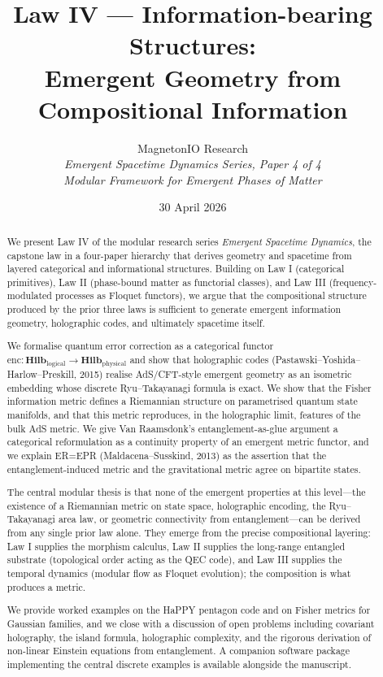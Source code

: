 \documentclass[12pt]{article}
\title{Law IV --- Information-bearing Structures:\\
Emergent Geometry from Compositional Information}
\author{MagnetonIO Research \\
\textit{Emergent Spacetime Dynamics Series, Paper 4 of 4} \\
\textit{Modular Framework for Emergent Phases of Matter}}
\date{30 April 2026}
\theoremstyle{definition}
\theoremstyle{remark}
\newcommand{\Hilb}{\mathbf{Hilb}}
\newcommand{\enc}{\mathrm{enc}}
\begin{document}
\maketitle

\begin{abstract}
We present Law IV of the modular research series \emph{Emergent Spacetime Dynamics}, the capstone law in a four-paper hierarchy that derives geometry and spacetime from layered categorical and informational structures. Building on Law I (categorical primitives), Law II (phase-bound matter as functorial classes), and Law III (frequency-modulated processes as Floquet functors), we argue that the compositional structure produced by the prior three laws is sufficient to generate emergent information geometry, holographic codes, and ultimately spacetime itself.

We formalise quantum error correction as a categorical functor $\enc \colon \Hilb_{\mathrm{logical}} \to \Hilb_{\mathrm{physical}}$ and show that holographic codes (Pastawski--Yoshida--Harlow--Preskill, 2015) realise AdS/CFT-style emergent geometry as an isometric embedding whose discrete Ryu--Takayanagi formula is exact. We show that the Fisher information metric defines a Riemannian structure on parametrised quantum state manifolds, and that this metric reproduces, in the holographic limit, features of the bulk AdS metric. We give Van Raamsdonk's entanglement-as-glue argument a categorical reformulation as a continuity property of an emergent metric functor, and we explain ER=EPR (Maldacena--Susskind, 2013) as the assertion that the entanglement-induced metric and the gravitational metric agree on bipartite states.

The central modular thesis is that none of the emergent properties at this level---the existence of a Riemannian metric on state space, holographic encoding, the Ryu--Takayanagi area law, or geometric connectivity from entanglement---can be derived from any single prior law alone. They emerge from the precise compositional layering: Law I supplies the morphism calculus, Law II supplies the long-range entangled substrate (topological order acting as the QEC code), and Law III supplies the temporal dynamics (modular flow as Floquet evolution); the composition is what produces a metric.

We provide worked examples on the HaPPY pentagon code and on Fisher metrics for Gaussian families, and we close with a discussion of open problems including covariant holography, the island formula, holographic complexity, and the rigorous derivation of non-linear Einstein equations from entanglement. A companion software package implementing the central discrete examples is available alongside the manuscript.
\end{abstract}
\end{document}
